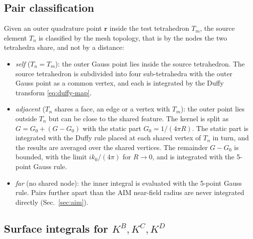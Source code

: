 \documentclass[11pt,a4paper]{article}
\begin{document}
\subsection{Pair classification}
\label{sec:pair-class}

Given an outer quadrature point $\bm{r}$ inside the test tetrahedron
$T_m$, the source element $T_n$ is classified by the mesh topology,
that is by the nodes the two tetrahedra share, and not by a distance:
\begin{itemize}
  \item \emph{self} ($T_n = T_m$): the outer Gauss point lies inside
        the source tetrahedron. The source tetrahedron is subdivided
        into four sub-tetrahedra with the outer Gauss point as a common
        vertex, and each is integrated by the Duffy transform
        \eqref{eq:duffy-map}.
  \item \emph{adjacent} ($T_n$ shares a face, an edge or a vertex with
        $T_m$): the outer point lies outside $T_n$ but can be close to
        the shared feature. The kernel is split as
        $G = G_0 + (G - G_0)$ with the static part
        $G_0 = 1/(4\pi R)$. The static part is integrated with the
        Duffy rule placed at each shared vertex of $T_n$ in turn, and
        the results are averaged over the shared vertices. The
        remainder $G - G_0$ is bounded, with the limit
        $i k_0/(4\pi)$ for $R \to 0$, and is integrated with the
        5-point Gauss rule.
  \item \emph{far} (no shared node): the inner integral is evaluated
        with the 5-point Gauss rule. Pairs further apart than the AIM
        near-field radius are never integrated directly
        (Sec.~\ref{sec:aim}).
\end{itemize}

\subsection{Surface integrals for $K^{B}, K^{C}, K^{D}$}
\label{sec:surface-int}
\end{document}
